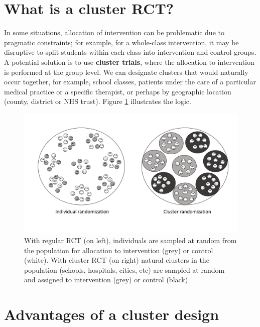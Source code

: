 \documentclass{krantz}
\begin{document}
\hypertarget{what-is-a-cluster-rct}{%
\section{What is a cluster RCT?}\label{what-is-a-cluster-rct}}

In some situations, allocation of intervention can be problematic due to pragmatic constraints; for example, for a whole-class intervention, it may be disruptive to split students within each class into intervention and control groups. A potential solution is to use \textbf{cluster trials}, where the allocation to intervention is performed at the group level. We can designate clusters that would naturally occur together, for example, school classes, patients under the care of a particular medical practice or a specific therapist, or perhaps by geographic location (county, district or NHS trust). Figure \ref{fig:cluster-diag} illustrates the logic.\\

\begin{center}
\begin{figure}
\includegraphics[width=0.8\linewidth]{images_bw/clusterdemo} \caption{With regular RCT (on left), individuals are sampled at random from the population for allocation to intervention (grey) or control (white).  With cluster RCT (on right) natural clusters in the population (schools, hospitals, cities, etc) are sampled at random and assigned to intervention (grey) or control (black)}\label{fig:cluster-diag}
\end{figure}
\end{center}

\hypertarget{advantages-of-a-cluster-design}{%
\section{Advantages of a cluster design}\label{advantages-of-a-cluster-design}}
\end{document}
